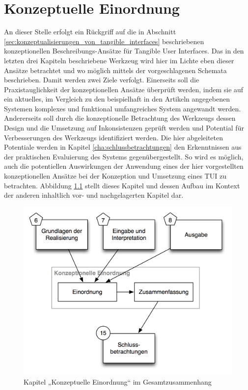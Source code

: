 
\chapter{Konzeptuelle Einordnung} %
\label{cha:konzeptionelle_evaluierung}

An dieser Stelle erfolgt ein Rückgriff auf die in Abschnitt \ref{sec:konzeptualisierungen_von_tangible_interfaces} beschriebenen konzeptionellen Beschreibungs-Ansätze für Tangible User Interfaces. Das in den letzten drei Kapiteln beschriebene Werkzeug wird hier im Lichte eben dieser Ansätze betrachtet und wo möglich mittels der vorgeschlagenen Schemata beschrieben. Damit werden zwei Ziele verfolgt. Einerseits soll die Praxistauglichkeit der konzeptionellen Ansätze überprüft werden, indem sie auf ein aktuelles, im Vergleich zu den beispielhaft in den Artikeln angegebenen Systemen komplexes und funktional umfangreiches System angewandt werden. Andererseits soll durch die konzeptionelle Betrachtung des Werkzeugs dessen Design und die Umsetzung auf Inkonsistenzen geprüft werden und Potential für Verbesserungen des Werkzeugs identifiziert werden. Die hier abgeleiteten Potentiale werden in Kapitel \ref{cha:schlussbetrachtungen} den Erkenntnissen aus der praktischen Evaluierung des Systems gegenübergestellt. So wird es möglich, auch die potentiellen Auswirkungen der Anwendung eines der hier vorgestellten konzeptionellen Ansätze bei der Konzeption und Umsetzung eines \gls{TUI} zu betrachten. Abbildung \ref{fig:img_Kontextgrafiken_k10} stellt dieses Kapitel und dessen Aufbau im Kontext der anderen inhaltlich vor- und nachgelagerten Kapitel dar.


\begin{figure}[htbp]
	\centering
		\includegraphics[scale=0.6]{img/Kontextgrafiken/k10.png}
	\caption{Kapitel „Konzeptuelle Einordnung“ im Gesamtzusammenhang}
	\label{fig:img_Kontextgrafiken_k10}
\end{figure}

